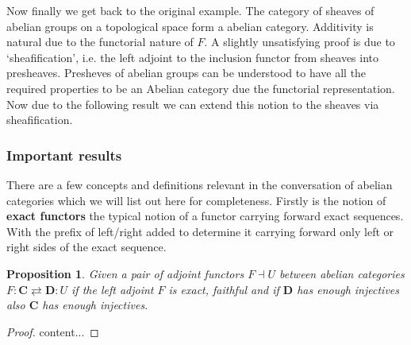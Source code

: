 \documentclass[12pt]{article}
\numberwithin{equation}{section}
\newtheorem{proposition}{Proposition}[section]
\begin{document}
\begin{appendices}
\begin{enumerate}
			Now finally we get back to the original example. The category of sheaves of abelian groups on a topological space form a abelian category. Additivity is natural due to the functorial nature of $F$. A slightly unsatisfying proof is due to `sheafification', i.e. the left adjoint to the inclusion functor from sheaves into presheaves. Presheves of abelian groups can be understood to have all the required properties to be an Abelian category due the functorial representation. Now due to the following result \cite{stacks1} we can extend this notion to the sheaves via sheafification.
		\end{enumerate}
		
		\subsubsection{Important results}
		There are a few concepts and definitions relevant in the conversation of abelian categories which we will list out here for completeness. Firstly is the notion of \textbf{exact functors} the typical notion of a functor carrying forward exact sequences. With the prefix of left/right added to determine it carrying forward only left or right sides of the exact sequence.
		
		
		\begin{proposition}\label{adjointinjective}
			Given a pair of adjoint functors $F \dashv U$ between abelian categories $F:\mathbf{C} \rightleftarrows \mathbf{D}:U$ if the left adjoint $F$ is exact, faithful and if $ \mathbf{D}$ has enough injectives also $\mathbf{C}$ has enough injectives.
		\end{proposition}
		\begin{proof}
			content...
		\end{proof}
	\end{appendices}
	\appendix
	
	

	
	
	
	
	
\end{document}
